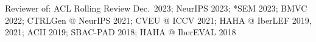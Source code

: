 
{\small Reviewer of: ACL Rolling Review Dec.\ 2023; NeurIPS 2023; *SEM 2023; BMVC 2022; CTRLGen @ NeurIPS 2021; CVEU @ ICCV 2021; HAHA @ IberLEF 2019, 2021; ACII 2019; SBAC-PAD 2018; HAHA @ IberEVAL 2018}
